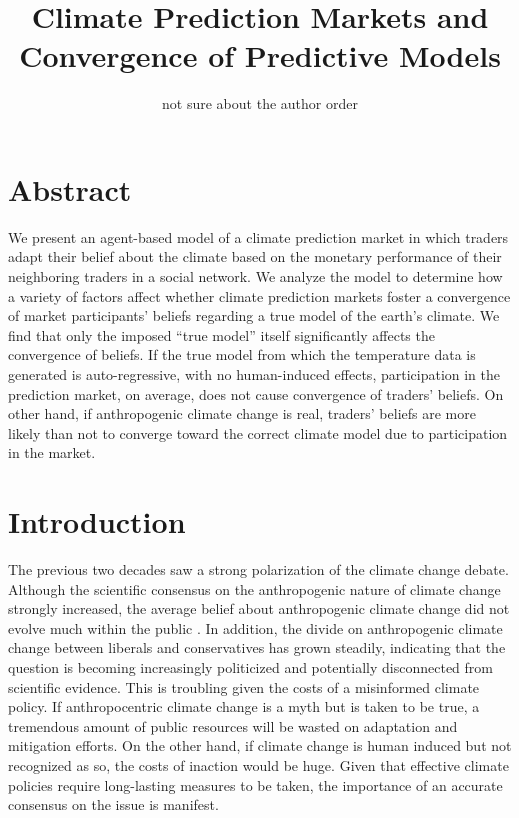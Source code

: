\documentclass{article}\usepackage[]{graphicx}\usepackage[]{color}
\begin{document}
\title{Climate Prediction Markets and Convergence of Predictive Models}
\author{not sure about the author order}

\maketitle
	
\section*{Abstract}
We present an agent-based model of a climate prediction market in which traders adapt their belief about the climate based on the monetary performance of their neighboring traders in a social network. We analyze the model to determine how a variety of factors affect whether climate prediction markets foster a convergence of market participants' beliefs regarding a true model of the earth's climate. We find that only the imposed ``true model'' itself significantly affects the convergence of beliefs. If the true model from which the temperature data is generated is auto-regressive, with no human-induced effects, participation in the prediction market, on average, does not cause convergence of traders' beliefs. On other hand, if anthropogenic climate change is real, traders' beliefs are more likely than not to converge toward the correct climate model due to participation in the market.

\section*{Introduction}
	
The previous two decades saw a strong polarization of the climate change debate. Although the scientific consensus on the anthropogenic nature of climate change strongly increased, the average belief about anthropogenic climate change did not evolve much within the public \cite{Vandenbergh2013f}. In addition, the divide on anthropogenic climate change between liberals and conservatives has grown steadily, indicating that the question is becoming increasingly politicized and potentially disconnected from scientific evidence. This is troubling given the costs of a misinformed climate policy. If anthropocentric climate change is a myth but is taken to be true, a tremendous amount of public resources will be wasted on adaptation and mitigation efforts. On the other hand, if climate change is human induced but not recognized as so, the costs of inaction would be huge. Given that effective climate policies require long-lasting measures to be taken, the importance of an accurate consensus on the issue is manifest.
	
\end{document}
